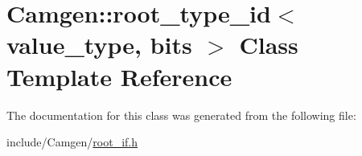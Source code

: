 \hypertarget{a00482}{}\section{Camgen\+:\+:root\+\_\+type\+\_\+id$<$ value\+\_\+type, bits $>$ Class Template Reference}
\label{a00482}


The documentation for this class was generated from the following file\+:\begin{DoxyCompactItemize}
\item 
include/\+Camgen/\hyperlink{a00760}{root\+\_\+if.\+h}\end{DoxyCompactItemize}
